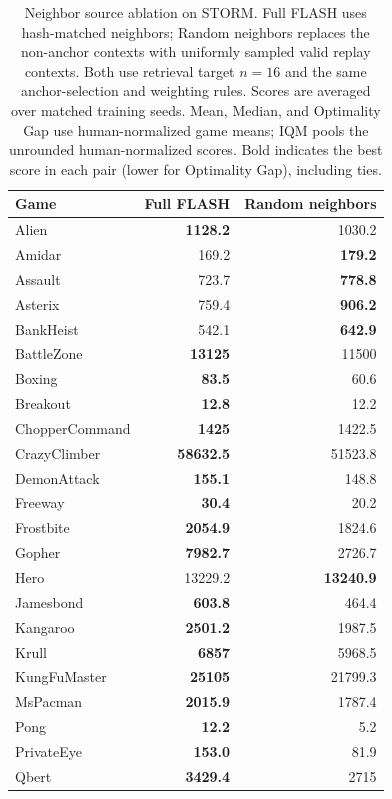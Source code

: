 \documentclass{article} %
\begin{document}
\begin{table}[!htbp]
\centering
\small
\caption{Neighbor source ablation on STORM. Full FLASH uses hash-matched neighbors; Random neighbors replaces the non-anchor contexts with uniformly sampled valid replay contexts. Both use retrieval target $n=16$ and the same anchor-selection and weighting rules. Scores are averaged over matched training seeds. Mean, Median, and Optimality Gap use human-normalized game means; IQM pools the unrounded human-normalized scores. Bold indicates the best score in each pair (lower for Optimality Gap), including ties.}
\label{tab:random_neighbor_ablation}
\begin{tabular}{lrr}
\toprule
Game & Full FLASH & Random neighbors \\
\midrule
Alien & \textbf{1128.2} & 1030.2 \\
Amidar & 169.2 & \textbf{179.2} \\
Assault & 723.7 & \textbf{778.8} \\
Asterix & 759.4 & \textbf{906.2} \\
BankHeist & 542.1 & \textbf{642.9} \\
BattleZone & \textbf{13125} & 11500 \\
Boxing & \textbf{83.5} & 60.6 \\
Breakout & \textbf{12.8} & 12.2 \\
ChopperCommand & \textbf{1425} & 1422.5 \\
CrazyClimber & \textbf{58632.5} & 51523.8 \\
DemonAttack & \textbf{155.1} & 148.8 \\
Freeway & \textbf{30.4} & 20.2 \\
Frostbite & \textbf{2054.9} & 1824.6 \\
Gopher & \textbf{7982.7} & 2726.7 \\
Hero & 13229.2 & \textbf{13240.9} \\
Jamesbond & \textbf{603.8} & 464.4 \\
Kangaroo & \textbf{2501.2} & 1987.5 \\
Krull & \textbf{6857} & 5968.5 \\
KungFuMaster & \textbf{25105} & 21799.3 \\
MsPacman & \textbf{2015.9} & 1787.4 \\
Pong & \textbf{12.2} & 5.2 \\
PrivateEye & \textbf{153.0} & 81.9 \\
Qbert & \textbf{3429.4} & 2715 \\

\end{tabular}
\end{table}
\end{document}

